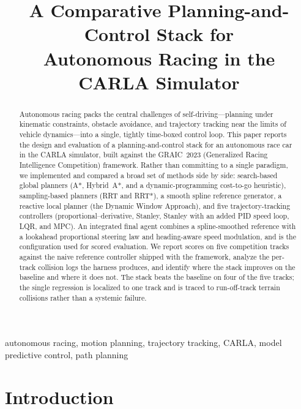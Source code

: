 \documentclass[conference]{IEEEtran}
\begin{document}
\title{A Comparative Planning-and-Control Stack for\\ Autonomous Racing in the CARLA Simulator}

\author{%
\and
{}
\and
{}
}

\maketitle

\begin{abstract}
Autonomous racing packs the central challenges of self-driving---planning
under kinematic constraints, obstacle avoidance, and trajectory tracking near
the limits of vehicle dynamics---into a single, tightly time-boxed control
loop. This paper reports the design and evaluation of a planning-and-control
stack for an autonomous race car in the CARLA simulator, built against the
GRAIC~2023 (Generalized Racing Intelligence Competition) framework. Rather than
committing to a single paradigm, we implemented and compared a broad set of
methods side by side: search-based global planners (A*, Hybrid~A*, and a
dynamic-programming cost-to-go heuristic), sampling-based planners (RRT and
RRT*), a smooth spline reference generator, a reactive local planner (the
Dynamic Window Approach), and five trajectory-tracking controllers
(proportional--derivative, Stanley, Stanley with an added PID speed loop, LQR,
and MPC). An integrated final agent combines a spline-smoothed reference with a
lookahead proportional steering law and heading-aware speed modulation, and is
the configuration used for scored evaluation. We report scores on five
competition tracks against the naive reference controller shipped with the
framework, analyze the per-track collision logs the harness produces, and
identify where the stack improves on the baseline and where it does not. The
stack beats the baseline on four of the five tracks; the single regression is
localized to one track and is traced to run-off-track terrain collisions rather
than a systemic failure.
\end{abstract}

\begin{IEEEkeywords}
autonomous racing, motion planning, trajectory tracking, CARLA, model
predictive control, path planning
\end{IEEEkeywords}

\section{Introduction}
\end{document}
